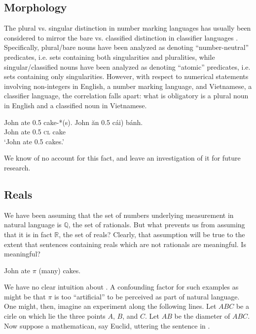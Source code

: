 \documentclass[output=paper]{langscibook}
\begin{document}
\subsection{Morphology}\largerpage[2]

The plural vs. singular distinction in number marking languages has usually been considered to mirror the bare vs. classified distinction in classifier languages \citep[cf.][]{Chierchia:1998, cheng1999bare}. Specifically, plural/bare nouns have been analyzed as denoting ``number-neutral'' predicates, i.e. sets containing both singularities and pluralities, while singular/classified nouns have been analyzed as denoting ``atomic'' predicates, i.e. sets containing only singularities. However, with respect to numerical statements involving non-integers in English, a number marking language, and Vietnamese, a classifier language, the correlation falls apart: what is obligatory is a plural noun in English and a classified noun in Vietnamese.

\ea
\ea John ate 0.5 cake-*(s).
\ex \gll John ăn 0.5 \minsp{*(} cái) bánh.\\        
         John ate 0.5 {} \textsc{cl} cake\\   
    \glt `John ate 0.5 cakes.'     
\z
\z

\noindent We know of no account for this fact, and leave an investigation of it for future research. 

\subsection{Reals}\label{hai-tri:sec:reals}\largerpage

We have been assuming that the set of numbers underlying measurement in natural language is $\mathbb{Q}$, the set of rationals. But what prevents us from assuming that it is in fact $\mathbb{R}$, the set of reals? Clearly, that assumption will be true to the extent that sentences containing reals which are not rationals are meaningful. Is  meaningful?

\ea
John ate $\pi$ (many) cakes.
\label{hai-tri:pi}
\z

\noindent We have no clear intuition about . A confounding factor for such examples as  might be that $\pi$ is too ``artificial'' to be perceived as part of natural language. One might, then, imagine an experiment along the following lines. Let $ABC$ be a cirle on which lie the three points $A$, $B$, and $C$. Let $AB$ be the diameter of $ABC$. Now suppose a mathematican, say Euclid, uttering the sentence in .
\end{document}
